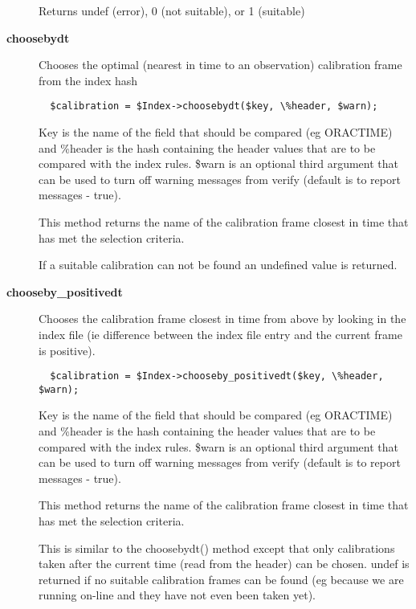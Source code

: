 \begin{description}
Returns undef (error), 0 (not suitable), or 1 (suitable)


\item[{\textbf{choosebydt}}] \mbox{}

Chooses the optimal (nearest in time to an observation) calibration
frame from the index hash

\begin{verbatim}
  $calibration = $Index->choosebydt($key, \%header, $warn);
\end{verbatim}


Key is the name of the field that should be compared (eg ORACTIME)
and \%header is the hash containing the header values that are to
be compared with the index rules. \$warn is an optional third argument
that can be used to turn off warning messages from verify (default
is to report messages - true).



This method returns the name of the calibration frame closest in
time that has met the selection criteria.



If a suitable calibration can not be found an undefined value is returned.


\item[{\textbf{chooseby\_positivedt}}] \mbox{}

Chooses the calibration frame closest in time from above by looking
in the index file (ie difference between the index file entry and
the current frame is positive).

\begin{verbatim}
  $calibration = $Index->chooseby_positivedt($key, \%header, $warn);
\end{verbatim}


Key is the name of the field that should be compared (eg ORACTIME)
and \%header is the hash containing the header values that are to
be compared with the index rules. \$warn is an optional third argument
that can be used to turn off warning messages from verify (default
is to report messages - true).



This method returns the name of the calibration frame closest in
time that has met the selection criteria.



This is similar to the choosebydt() method except that only
calibrations taken after the current time (read from the
header) can be chosen. undef is returned if no suitable
calibration frames can be found (eg because we are running
on-line and they have not even been taken yet).



\end{description}
